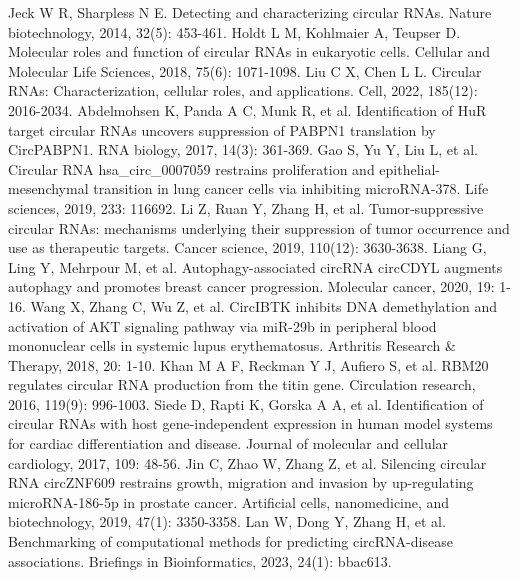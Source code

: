 \documentclass{bioinfo}
\begin{document}
\begin{thebibliography}{}
\normalsize
Jeck W R, Sharpless N E. Detecting and characterizing circular RNAs. Nature biotechnology, 2014, 32(5): 453-461.
Holdt L M, Kohlmaier A, Teupser D. Molecular roles and function of circular RNAs in eukaryotic cells. Cellular and Molecular Life Sciences, 2018, 75(6): 1071-1098.
Liu C X, Chen L L. Circular RNAs: Characterization, cellular roles, and applications. Cell, 2022, 185(12): 2016-2034.
Abdelmohsen K, Panda A C, Munk R, et al. Identification of HuR target circular RNAs uncovers suppression of PABPN1 translation by CircPABPN1. RNA biology, 2017, 14(3): 361-369.
Gao S, Yu Y, Liu L, et al. Circular RNA hsa\_circ\_0007059 restrains proliferation and epithelial-mesenchymal transition in lung cancer cells via inhibiting microRNA-378. Life sciences, 2019, 233: 116692.
Li Z, Ruan Y, Zhang H, et al. Tumor‐suppressive circular RNAs: mechanisms underlying their suppression of tumor occurrence and use as therapeutic targets. Cancer science, 2019, 110(12): 3630-3638.
Liang G, Ling Y, Mehrpour M, et al. Autophagy-associated circRNA circCDYL augments autophagy and promotes breast cancer progression. Molecular cancer, 2020, 19: 1-16.
Wang X, Zhang C, Wu Z, et al. CircIBTK inhibits DNA demethylation and activation of AKT signaling pathway via miR-29b in peripheral blood mononuclear cells in systemic lupus erythematosus. Arthritis Research \& Therapy, 2018, 20: 1-10.
Khan M A F, Reckman Y J, Aufiero S, et al. RBM20 regulates circular RNA production from the titin gene. Circulation research, 2016, 119(9): 996-1003.
Siede D, Rapti K, Gorska A A, et al. Identification of circular RNAs with host gene-independent expression in human model systems for cardiac differentiation and disease. Journal of molecular and cellular cardiology, 2017, 109: 48-56.
Jin C, Zhao W, Zhang Z, et al. Silencing circular RNA circZNF609 restrains growth, migration and invasion by up-regulating microRNA-186-5p in prostate cancer. Artificial cells, nanomedicine, and biotechnology, 2019, 47(1): 3350-3358.
Lan W, Dong Y, Zhang H, et al. Benchmarking of computational methods for predicting circRNA-disease associations. Briefings in Bioinformatics, 2023, 24(1): bbac613.

\end{thebibliography}
\end{document}
